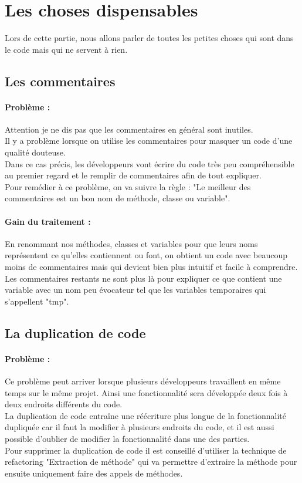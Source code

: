 \documentclass[a4paper,twoside,12pt,openright]{report}
\begin{document}
\section{Les choses dispensables}
Lors de cette partie, nous allons parler de toutes les petites choses qui sont dans le code mais qui ne servent à rien.

\subsection{Les commentaires}
\paragraph{Problème :}
Attention je ne dis pas que les commentaires en général sont inutiles.\\
Il y a problème lorsque on utilise les commentaires pour masquer un code d'une qualité douteuse.\\
Dans ce cas précis, les développeurs vont écrire du code très peu compréhensible au premier regard et le remplir de commentaires afin de tout expliquer.\\
Pour remédier à ce problème, on va suivre la règle : "Le meilleur des commentaires est un bon nom de méthode, classe ou variable".\\

\paragraph{Gain du traitement :}
En renommant nos méthodes, classes et variables pour que leurs noms représentent ce qu'elles contiennent ou font, on obtient un code avec beaucoup moins de commentaires mais qui devient bien plus intuitif et facile à comprendre.\\
Les commentaires restants ne sont plus là pour expliquer ce que contient une variable avec un nom peu évocateur tel que les variables temporaires qui s'appellent "tmp".\\

\subsection{La duplication de code}
\paragraph{Problème :}
Ce problème peut arriver lorsque plusieurs développeurs travaillent en même temps sur le même projet. Ainsi une fonctionnalité sera développée deux fois à deux endroits différents du code.\\
La duplication de code entraîne une réécriture plus longue de la fonctionnalité dupliquée car il faut la modifier à plusieurs endroits du code, et il est aussi possible d'oublier de modifier la fonctionnalité dans une des parties.\\
Pour supprimer la duplication de code il est conseillé d'utiliser la technique de refactoring "Extraction de méthode" qui va permettre d'extraire la méthode pour ensuite uniquement faire des appels de méthodes.\\
\end{document}
